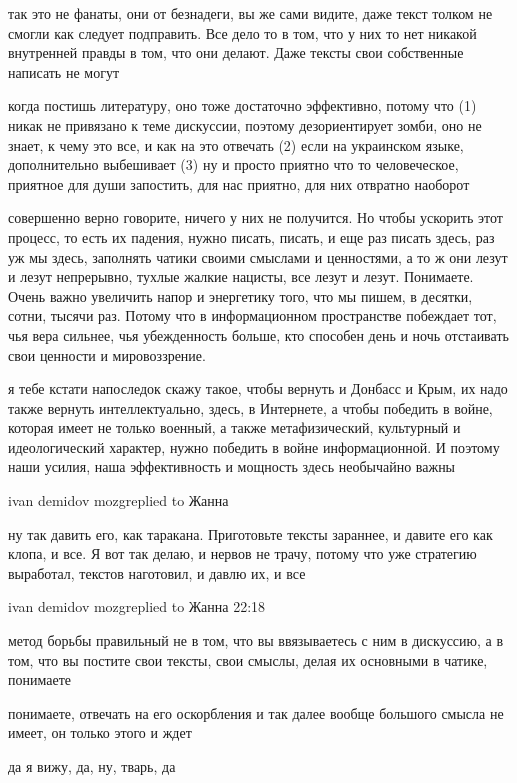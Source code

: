 так это не фанаты, они от безнадеги, вы же сами видите, даже текст толком не
смогли как следует подправить. Все дело то в том, что у них то нет никакой
внутренней правды в том, что они делают. Даже тексты свои собственные написать
не могут

когда постишь литературу, оно тоже достаточно эффективно, потому что (1) никак
не привязано к теме дискуссии, поэтому дезориентирует зомби, оно не знает, к
чему это все, и как на это отвечать (2) если на украинском языке, дополнительно
выбешивает (3) ну и просто приятно что то человеческое, приятное для души
запостить, для нас приятно, для них отвратно наоборот

совершенно верно говорите, ничего у них не получится. Но чтобы ускорить этот
процесс, то есть их падения, нужно писать, писать, и еще раз писать здесь, раз
уж мы здесь, заполнять чатики своими смыслами и ценностями, а то ж они лезут и
лезут непрерывно, тухлые жалкие нацисты, все лезут и лезут. Понимаете. Очень
важно увеличить напор и энергетику того, что мы пишем, в десятки, сотни, тысячи
раз. Потому что в информационном пространстве побеждает тот, чья вера сильнее,
чья убежденность больше, кто способен день и ночь отстаивать свои ценности и
мировоззрение.

я тебе кстати напоследок скажу такое, чтобы вернуть и Донбасс и Крым, их надо
также вернуть интеллектуально, здесь, в Интернете, а чтобы победить в войне,
которая имеет не только военный, а также метафизический, культурный и
идеологический характер, нужно победить в войне информационной. И поэтому наши
усилия, наша эффективность и мощность здесь необычайно важны

ivan demidov mozgreplied to Жанна

ну так давить его, как таракана. Приготовьте тексты зараннее, и давите его как
клопа, и все. Я вот так делаю, и нервов не трачу, потому что уже стратегию
выработал, текстов наготовил, и давлю их, и все

ivan demidov mozgreplied to Жанна
22:18

метод борьбы правильный не в том, что вы ввязываетесь с ним в дискуссию, а в
том, что вы постите свои тексты, свои смыслы, делая их основными в чатике,
понимаете

понимаете, отвечать на его оскорбления и так далее вообще большого смысла не
имеет, он только этого и ждет

да я вижу, да, ну, тварь, да

